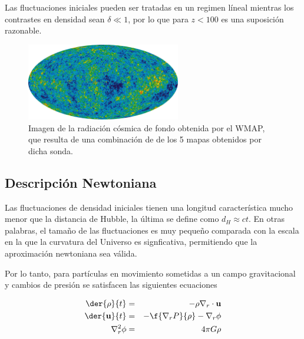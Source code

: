 Las fluctuaciones iniciales pueden ser tratadas en un regimen líneal mientras 
los contrastes en densidad sean $\delta\ll 1$, por lo que para $z<100$ es una 
suposición razonable. 

\begin{figure}[htbp]
       \centering
               \includegraphics[width=0.6\textwidth]{Images/chapter2/CMB.png}
       \caption{\small Imagen de la radiación cósmica de fondo obtenida por el WMAP,
      que resulta de una combinación de de los 5 mapas obtenidos por dicha sonda. }
       \label{CMB}
 \end{figure}

\subsection{Descripción Newtoniana}

Las fluctuaciones de densidad iniciales tienen una longitud característica mucho menor 
que la distancia de Hubble, la última se define como $d_H \approx ct$. En otras palabras,
el tamaño de las fluctuaciones es muy pequeño comparada con la escala en la que la 
curvatura del Universo es signficativa, permitiendo que la aproximación newtoniana sea válida. 

Por lo tanto, para partículas en movimiento sometidas a un campo gravitacional y cambios 
de presión se satisfacen las siguientes ecuaciones

\begin{eqnarray}
\der{\rho}{t}&=& -\rho \nabla_r\cdot \textbf{u} \nonumber\\
\der{\textbf{u}}{t} &=& -\f{\nabla_r P}{\rho}-\nabla_r\phi \nonumber\\
\nabla^2_r \phi & =& 4\pi G\rho 
\label{euler}
\end{eqnarray}

